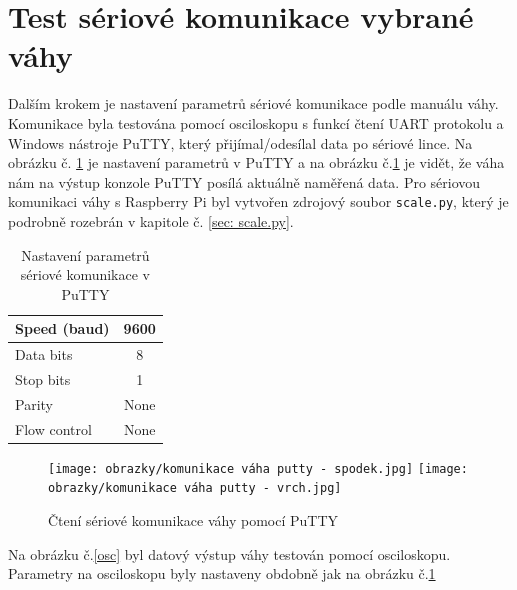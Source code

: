 \section{Test sériové komunikace vybrané váhy}
Dalším krokem je nastavení parametrů sériové komunikace podle manuálu váhy\cite{vaha_datasheed}. Komunikace byla testována pomocí osciloskopu s funkcí čtení UART protokolu a Windows nástroje PuTTY, který přijímal/odesílal data po sériové lince. 
Na obrázku č. \ref{putty} je nastavení parametrů v PuTTY a na obrázku č.\ref{puttyyyy} je vidět, že váha nám na výstup konzole PuTTY posílá aktuálně naměřená data. Pro sériovou komunikaci váhy s Raspberry Pi byl vytvořen zdrojový soubor \texttt{scale.py}, který je podrobně rozebrán v kapitole č. \ref{sec: scale.py}.

\begin{table}[h]
    \centering
    \begin{tabular}{|l|c|}
        \hline
        Speed (baud)     & 9600 \\ \hline
        Data bits        & 8    \\ \hline
        Stop bits        & 1    \\ \hline
        Parity           & None \\ \hline
        Flow control     & None \\ \hline
    \end{tabular}
    \caption{Nastavení parametrů sériové komunikace v PuTTY}
    \label{putty}
\end{table}



\begin{figure}[H]
    \begin{center}
        \texttt{[image: obrazky/komunikace váha putty - spodek.jpg]}
        \texttt{[image: obrazky/komunikace váha putty - vrch.jpg]}
    \end{center}
    \caption{Čtení sériové komunikace váhy pomocí PuTTY}
    \label{puttyyyy}
\end{figure}

Na obrázku č.\ref{osc} byl datový výstup váhy testován pomocí osciloskopu. Parametry na osciloskopu byly nastaveny obdobně jak na obrázku č.\ref{putty}

